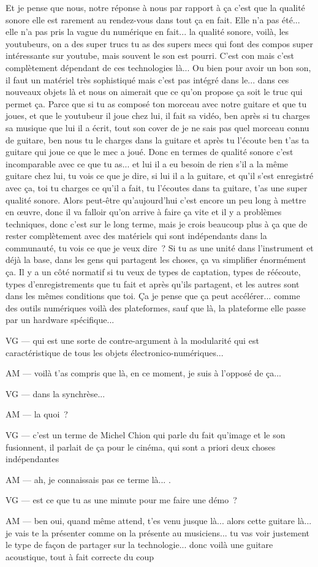 Et je pense que nous, notre réponse à nous par rapport à ça c'est que la qualité sonore elle est rarement au rendez-vous dans tout ça en fait. Elle n'a pas été... elle n'a pas pris la vague du numérique en fait... la qualité sonore, voilà, les youtubeurs, on a des super trucs tu as des supers mecs qui font des compos super intéressante sur youtube, mais souvent le son est pourri. C'est con mais c'est complètement dépendant de ces technologies là... Ou bien pour avoir un bon son, il faut un matériel très sophistiqué mais c'est pas intégré dans le... dans ces nouveaux objets là et nous on aimerait que ce qu'on propose ça soit le truc qui permet ça. Parce que si tu as composé ton morceau avec notre guitare et que tu joues, et que le youtubeur il joue chez lui, il fait sa vidéo, ben après si tu charges sa musique que lui il a écrit, tout son cover de je ne sais pas quel morceau connu de guitare, ben nous tu le charges dans la guitare et après tu l'écoute ben t'as ta guitare qui joue ce que le mec a joué. Donc en termes de qualité sonore c'est incomparable avec ce que tu as... et lui il a eu besoin de rien s'il a la même guitare chez lui, tu vois ce que je dire, si lui il a la guitare, et qu'il s'est enregistré avec ça, toi tu charges ce qu'il a fait, tu l'écoutes dans ta guitare, t'as une super qualité sonore. Alors peut-être qu'aujourd'hui c'est encore un peu long à mettre en œuvre, donc il va falloir qu'on arrive à faire ça vite et il y a problèmes techniques, donc c'est sur le long terme, mais je crois beaucoup plus à ça que de rester complètement avec des matériels qui sont indépendants dans la communauté, tu vois ce que je veux dire ? Si tu as une unité dans l'instrument et déjà la base, dans les gens qui partagent les choses, ça va simplifier énormément ça. Il y a un côté normatif si tu veux de types de captation, types de réécoute, types d'enregistrements que tu fait et après qu'ils partagent, et les autres sont dans les mêmes conditions que toi. Ça je pense que ça peut accélérer... comme des outils numériques voilà des plateformes, sauf que là, la plateforme elle passe par un hardware spécifique... 

VG — qui est une sorte de contre-argument à la modularité qui est caractéristique de tous les objets électronico-numériques... 

AM — voilà t'as compris que là, en ce moment, je suis à l'opposé de ça... 

VG — dans la synchrèse... 

AM — la quoi ?

VG — c'est un terme de Michel Chion qui parle du fait qu'image et le son fusionnent, il parlait de ça pour le cinéma, qui sont a priori deux choses indépendantes

AM — ah, je connaissais pas ce terme là... .

VG — est ce que tu as une minute pour me faire une démo ?

AM — ben oui, quand même attend, t'es venu jusque là... alors cette guitare là...  je vais te la présenter comme on la présente au musiciens... tu vas voir justement le type de façon de partager sur la technologie... donc voilà une guitare acoustique, tout à fait correcte du coup 

